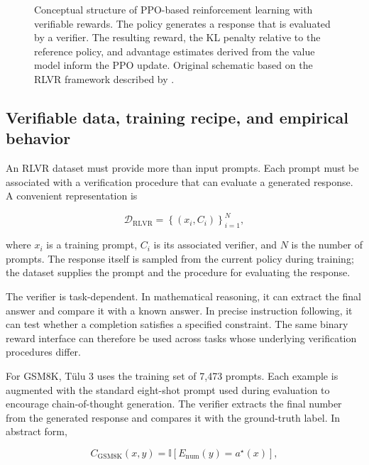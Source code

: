 \begin{figure}[htbp]
    \centering
    
    \caption{Conceptual structure of PPO-based reinforcement learning with
    verifiable rewards. The policy generates a response that is evaluated by
    a verifier. The resulting reward, the KL penalty relative to the reference
    policy, and advantage estimates derived from the value model inform the
    PPO update. Original schematic based on the RLVR framework described by
    \textcite{lambert2025tulu3}.}
    \label{fig:rlvr-training-pipeline}
\end{figure}

\subsection{Verifiable data, training recipe, and empirical behavior}
\label{subsec:rlvr-data-recipe-results}

An RLVR dataset must provide more than input prompts. Each prompt must be
associated with a verification procedure that can evaluate a generated
response. A convenient representation is

\begin{equation}
    \mathcal{D}_{\mathrm{RLVR}}
    =
    \left\{
        (x_i,C_i)
    \right\}_{i=1}^{N},
    \label{eq:rlvr-dataset}
\end{equation}

where \(x_i\) is a training prompt, \(C_i\) is its associated verifier, and
\(N\) is the number of prompts. The response itself is sampled from the
current policy during training; the dataset supplies the prompt and the
procedure for evaluating the response.

The verifier is task-dependent. In mathematical reasoning, it can extract
the final answer and compare it with a known answer. In precise instruction
following, it can test whether a completion satisfies a specified constraint.
The same binary reward interface can therefore be used across tasks whose
underlying verification procedures differ.

For GSM8K, Tülu 3 uses the training set of 7,473 prompts. Each example is
augmented with the standard eight-shot prompt used during evaluation to
encourage chain-of-thought generation. The verifier extracts the final
number from the generated response and compares it with the ground-truth
label. In abstract form,

\begin{equation}
    C_{\mathrm{GSM8K}}(x,y)
    =
    \mathbb{I}
    \left[
        E_{\mathrm{num}}(y)=a^\star(x)
    \right],
    \label{eq:rlvr-gsm8k-verifier}
\end{equation}

